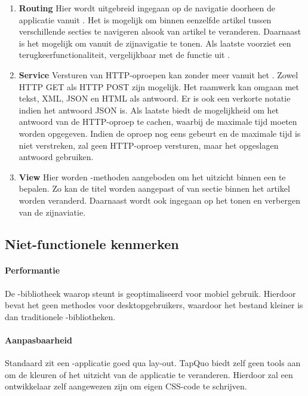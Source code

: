 \begin{enumerate}
\item \textbf{Routing }
Hier wordt uitgebreid ingegaan op de navigatie doorheen de applicatie vanuit \js{}.
Het is mogelijk om binnen eenzelfde artikel tussen verschillende secties te navigeren alsook van artikel te veranderen.
Daarnaast is het mogelijk om vanuit \js{} de zijnavigatie te tonen.
Als laatste voorziet \lungo{} een terugkeerfunctionaliteit, vergelijkbaar met de functie  uit \js{}.

\item \textbf{Service }
Versturen van HTTP-oproepen kan zonder meer vanuit het \lungo{}.
Zowel HTTP GET als HTTP POST zijn mogelijk.
Het raamwerk kan omgaan met tekst, XML, JSON en HTML als antwoord.
Er is ook een verkorte notatie indien het antwoord JSON is.
Als laatste biedt \lungo{} de mogelijkheid om het antwoord van de HTTP-oproep te cachen, waarbij de maximale tijd moeten worden opgegeven.
Indien de oproep nog eens gebeurt en de maximale tijd is niet verstreken, zal \lungo{} geen HTTP-oproep versturen, maar het opgeslagen antwoord gebruiken.

\item \textbf{View }
Hier worden \js{}-methoden aangeboden om het uitzicht binnen een  te bepalen.
Zo kan de titel worden aangepast of van sectie binnen het artikel worden veranderd.
Daarnaast wordt ook ingegaan op het tonen en verbergen van de zijnaviatie.
 
\end{enumerate}

\subsection{Niet-functionele kenmerken}
\paragraph{Performantie}
De \js{}-bibliotheek waarop \lungo{} steunt is geoptimaliseerd voor mobiel gebruik.
Hierdoor bevat het geen methodes voor desktopgebruikers, waardoor het bestand kleiner is dan traditionele \js{}-bibliotheken.

\paragraph{Aanpasbaarheid}
\label{sec:lungo-aanpasbaarheid}
Standaard zit een \lungo{}-applicatie goed qua lay-out.
TapQuo biedt zelf geen tools aan om de kleuren of het uitzicht van de applicatie te veranderen.
Hierdoor zal een ontwikkelaar zelf aangewezen zijn om eigen CSS-code te schrijven.


